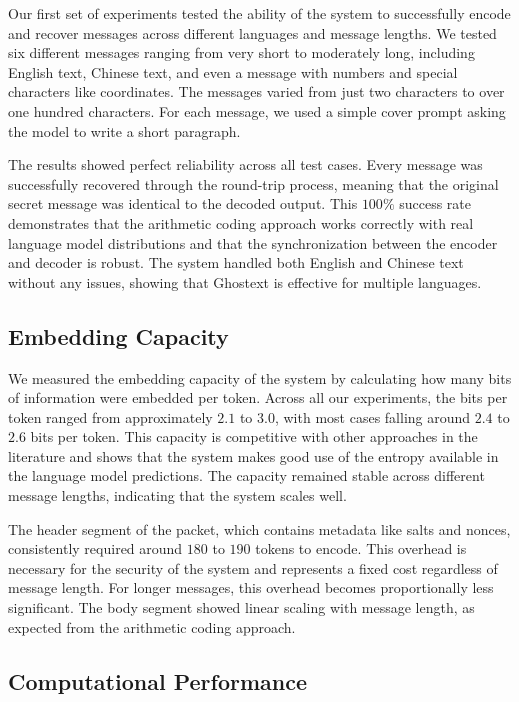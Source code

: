 \documentclass[sigconf,review,anonymous]{acmart}
\begin{document}
Our first set of experiments tested the ability of the system to successfully encode and recover messages across different languages and message lengths. We tested six different messages ranging from very short to moderately long, including English text, Chinese text, and even a message with numbers and special characters like coordinates. The messages varied from just two characters to over one hundred characters. For each message, we used a simple cover prompt asking the model to write a short paragraph.

The results showed perfect reliability across all test cases. Every message was successfully recovered through the round-trip process, meaning that the original secret message was identical to the decoded output. This $100\%$ success rate demonstrates that the arithmetic coding approach works correctly with real language model distributions and that the synchronization between the encoder and decoder is robust. The system handled both English and Chinese text without any issues, showing that Ghostext is effective for multiple languages.

\subsection{Embedding Capacity}

We measured the embedding capacity of the system by calculating how many bits of information were embedded per token. Across all our experiments, the bits per token ranged from approximately $2.1$ to $3.0$, with most cases falling around $2.4$ to $2.6$ bits per token. This capacity is competitive with other approaches in the literature and shows that the system makes good use of the entropy available in the language model predictions. The capacity remained stable across different message lengths, indicating that the system scales well.

The header segment of the packet, which contains metadata like salts and nonces, consistently required around $180$ to $190$ tokens to encode. This overhead is necessary for the security of the system and represents a fixed cost regardless of message length. For longer messages, this overhead becomes proportionally less significant. The body segment showed linear scaling with message length, as expected from the arithmetic coding approach.

\subsection{Computational Performance}
\end{document}
